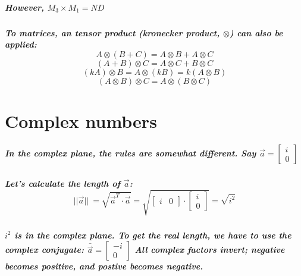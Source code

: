 \documentclass[11pt]{report}
\begin{document}
    \paragraph{
    However, \(M_3 \times M_1 = ND\)
    }

    \paragraph{
    To matrices, an tensor product (kronecker product, \(\otimes\)) can also be applied: \[A\otimes(B + C) = A\otimes B + A\otimes C\]
    \[(A + B)\otimes C = A\otimes C + B\otimes C\] 
    \[(kA)\otimes B = A \otimes (kB) = k(A\otimes B)\] 
    \[(A\otimes B) \otimes C = A \otimes(B\otimes C)\] 
    }
    
    
	\chapter{Complex numbers}\label{ComplexNumbers}

    \paragraph{In the complex plane, the rules are somewhat different. Say \(\vec{a} = \begin{bmatrix} i \\ 0 \end{bmatrix}\) 
    }

    \paragraph{
    Let's calculate the length of \(\vec{a}\):
    \[\lvert\lvert\vec{a}\lvert\lvert\ = \sqrt{\vec{a}^T \cdot \vec{a} } = \sqrt{\begin{bmatrix} i & 0 \end{bmatrix} \cdot \begin{bmatrix} i \\ 0 \end{bmatrix}} = \sqrt{i^2}\]
    }

    \paragraph{
    \(i^2\) is in the complex plane. To get the real length, we have to use the complex conjugate: \(\bar{\vec{a} } = \begin{bmatrix} -i \\ 0 \end{bmatrix}\) All complex factors invert; negative becomes positive, and postive becomes negative.
    }
\end{document}
